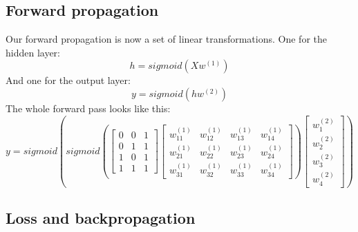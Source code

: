 \documentclass[10pt,a4paper]{article}
\begin{document}
\subsection{Forward propagation}
Our forward propagation is now a set of linear transformations. One for the hidden layer:
\begin{equation}
	h = sigmoid(Xw^{(1)})
\end{equation}
And one for the output layer:
\begin{equation}
	y = sigmoid(hw^{(2)})
\end{equation}
The whole forward pass looks like this:
\begin{equation}
	y = sigmoid(sigmoid(
	\begin{bmatrix}
		0 & 0 & 1 \\
		0 & 1 & 1 \\
		1 & 0 & 1 \\
		1 & 1 & 1
	\end{bmatrix}
	\begin{bmatrix}
		w^{(1)}_{11} & w^{(1)}_{12} & w^{(1)}_{13} & w^{(1)}_{14} \\
		w^{(1)}_{21} & w^{(1)}_{22} & w^{(1)}_{23} & w^{(1)}_{24} \\
		w^{(1)}_{31} & w^{(1)}_{32} & w^{(1)}_{33} & w^{(1)}_{34}
	\end{bmatrix}
	)
	\begin{bmatrix}
		w^{(2)}_{1} \\
		w^{(2)}_{2} \\
		w^{(2)}_{3} \\
		w^{(2)}_{4}
	\end{bmatrix}
	)
\end{equation}

\newpage

\subsection{Loss and backpropagation}
\end{document}
